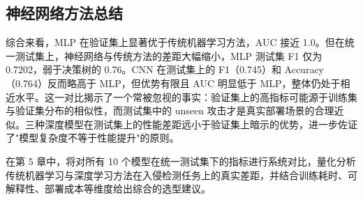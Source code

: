 \subsection{神经网络方法总结}

综合来看，MLP 在验证集上显著优于传统机器学习方法，AUC 接近 1.0。但在统一测试集上，神经网络与传统方法的差距大幅缩小，MLP 测试集 F1 仅为 0.7202，弱于决策树的 0.76。CNN 在测试集上的 F1（0.745）和 Accuracy（0.764）反而略高于 MLP，但优势有限且 AUC 明显低于 MLP，整体仍处于相近水平。这一对比揭示了一个常被忽视的事实：验证集上的高指标可能源于训练集与验证集分布的相似性，而测试集中的 unseen 攻击才是真实部署场景的合理近似。三种深度模型在测试集上的性能差距远小于验证集上暗示的优势，进一步佐证了"模型复杂度不等于性能提升"的原则。

在第 5 章中，将对所有 10 个模型在统一测试集下的指标进行系统对比，量化分析传统机器学习与深度学习方法在入侵检测任务上的真实差距，并结合训练耗时、可解释性、部署成本等维度给出综合的选型建议。

